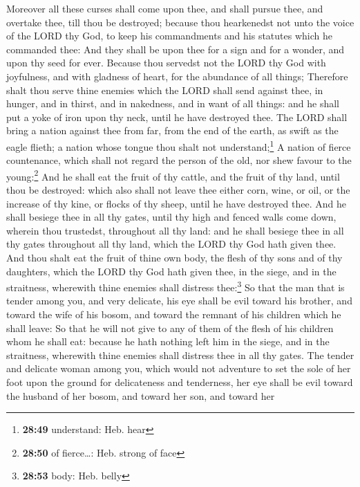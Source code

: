  Moreover all these curses shall come upon thee, and
shall pursue thee, and overtake thee, till thou be destroyed; because
thou hearkenedst not unto the voice of the LORD thy God, to keep his
commandments and his statutes which he commanded thee: 
And they shall be upon thee for a sign and for a wonder, and upon thy
seed for ever.  Because thou servedst not the LORD thy
God with joyfulness, and with gladness of heart, for the abundance of
all things;  Therefore shalt thou serve thine enemies
which the LORD shall send against thee, in hunger, and in thirst, and in
nakedness, and in want of all things: and he shall put a yoke of iron
upon thy neck, until he have destroyed thee.  The LORD
shall bring a nation against thee from far, from the end of the earth,
as swift as the eagle flieth; a nation whose tongue thou shalt not
understand;\footnote{\textbf{28:49} understand: Heb. hear}
 A nation of fierce countenance, which shall not regard
the person of the old, nor shew favour to the young:\footnote{\textbf{28:50}
  of fierce\ldots: Heb. strong of face}  And he shall eat
the fruit of thy cattle, and the fruit of thy land, until thou be
destroyed: which also shall not leave thee either corn, wine, or oil, or
the increase of thy kine, or flocks of thy sheep, until he have
destroyed thee.  And he shall besiege thee in all thy
gates, until thy high and fenced walls come down, wherein thou
trustedst, throughout all thy land: and he shall besiege thee in all thy
gates throughout all thy land, which the LORD thy God hath given thee.
 And thou shalt eat the fruit of thine own body, the
flesh of thy sons and of thy daughters, which the LORD thy God hath
given thee, in the siege, and in the straitness, wherewith thine enemies
shall distress thee:\footnote{\textbf{28:53} body: Heb. belly}
 So that the man that is tender among you, and very
delicate, his eye shall be evil toward his brother, and toward the wife
of his bosom, and toward the remnant of his children which he shall
leave:  So that he will not give to any of them of the
flesh of his children whom he shall eat: because he hath nothing left
him in the siege, and in the straitness, wherewith thine enemies shall
distress thee in all thy gates.  The tender and delicate
woman among you, which would not adventure to set the sole of her foot
upon the ground for delicateness and tenderness, her eye shall be evil
toward the husband of her bosom, and toward her son, and toward her
